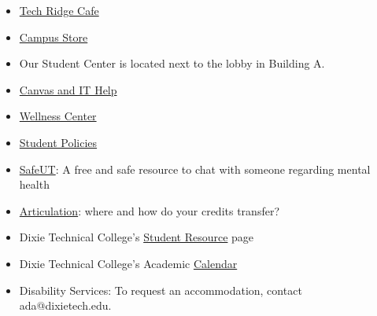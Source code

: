 \begin{itemize}
    \item \href{https://dixietech.edu/campus/cafe/}{Tech Ridge Cafe}
    \item \href{https://dixietech.edu/campus/store/}{Campus Store}
    \item Our Student Center is located next to the lobby in Building A.
    \item \href{https://forms.dixietech.edu/DixieTech/form/StudentHelpRequest/formperma/pWkSoM_E2LNBlWfMbwKYZwVf22UTWmUAxgEanByMi5o}{Canvas and IT Help}
    \item \href{https://dixietech.edu/campus/student-wellness-center/}{Wellness Center}
    \item \href{https://dixietech.edu/disclosures/policies/students/}{Student Policies}
    \item \href{https://dixietech.edu/students/safeut/}{SafeUT}: A free and safe resource to chat with someone regarding mental health
    \item \href{https://dixietech.edu/students/articulation/}{Articulation}: where and how do your credits transfer?
    \item Dixie Technical College's \href{https://dixietech.edu/students/}{Student Resource} page
    \item Dixie Technical College's Academic \href{https://dixietech.edu/calendar/}{Calendar}
    \item Disability Services: To request an accommodation, contact ada@dixietech.edu.
\end{itemize}
